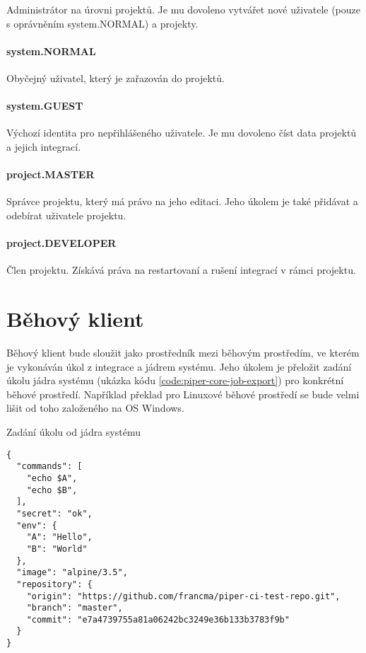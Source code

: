 Administrátor na úrovni projektů.
Je mu dovoleno vytvářet nové uživatele (pouze s oprávněním system.NORMAL) a projekty.

\paragraph{system.NORMAL}

Obyčejný uživatel, který je zařazován do projektů.

\paragraph{system.GUEST}

Výchozí identita pro nepřihlášeného uživatele.
Je mu dovoleno číst data projektů a jejich integrací.

\paragraph{project.MASTER}

Správce projektu, který má právo na jeho editaci.
Jeho úkolem je také přidávat a odebírat uživatele projektu.

\paragraph{project.DEVELOPER}

Člen projektu.
Získává práva na restartovaní a rušení integrací v rámci projektu.

\section{Běhový klient}

Běhový klient bude sloužit jako prostředník mezi běhovým prostředím, ve kterém je vykonáván úkol z integrace a jádrem systému.
Jeho úkolem je přeložit zadání úkolu jádra systému (ukázka kódu \ref{code:piper-core-job-export}) pro konkrétní běhové prostředí.
Například překlad pro Linuxové běhové prostředí se bude velmi lišit od toho založeného na OS Windows.

\begin{listing}[ht]
\caption{\label{code:piper-core-job-export}Zadání úkolu od jádra systému}
\begin{verbatim}
{
  "commands": [
    "echo $A",
    "echo $B",
  ],
  "secret": "ok",
  "env": {
    "A": "Hello",
    "B": "World"
  },
  "image": "alpine/3.5",
  "repository": {
    "origin": "https://github.com/francma/piper-ci-test-repo.git",
    "branch": "master",
    "commit": "e7a4739755a81a06242bc3249e36b133b3783f9b"
  }
}
\end{verbatim}
\end{listing}

